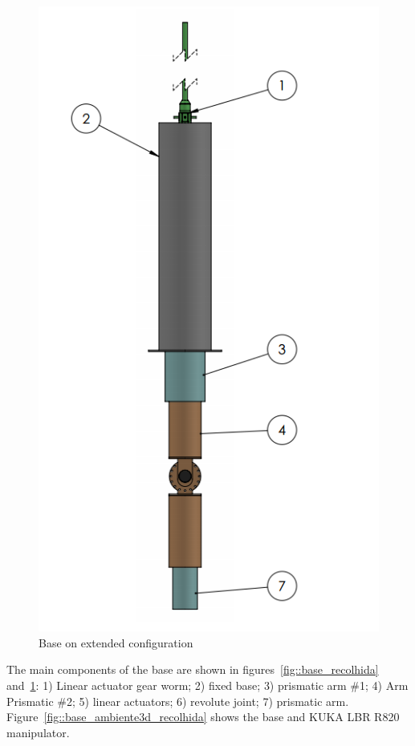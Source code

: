 \begin{figure}[h!]
\centering
	\includegraphics[width=\columnwidth]{figs/estudo/solid/Base_Extendida.PNG} 
	\caption{Base on extended configuration}
	\label{fig::base_extendida}
\end{figure}

The main components of the base are shown in figures~\ref{fig::base_recolhida}
and~\ref{fig::base_extendida}: 1) Linear actuator gear worm;
2) fixed base; 3) prismatic arm \#1; 4) Arm Prismatic \#2; 5) linear actuators;
6) revolute joint; 7) prismatic arm. Figure~\ref{fig::base_ambiente3d_recolhida} shows the base and KUKA LBR
R820 manipulator.


